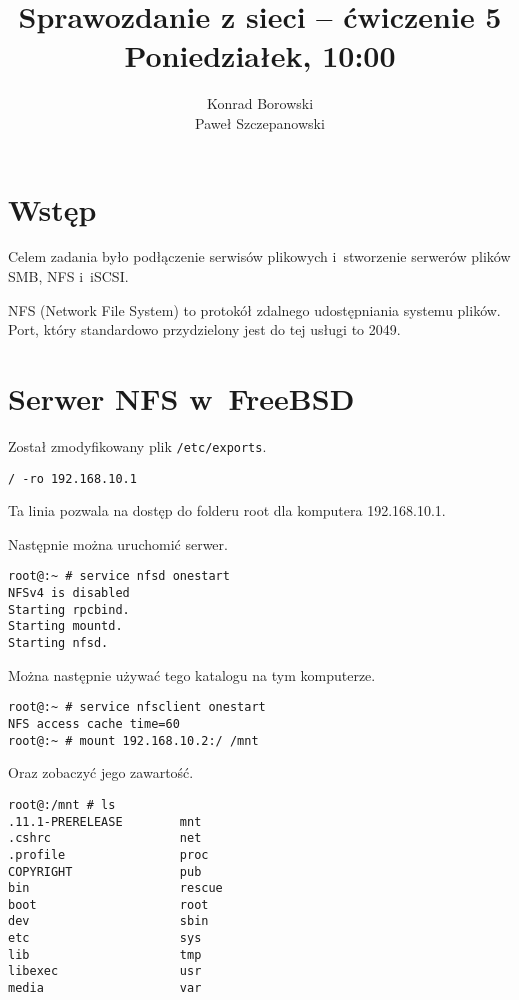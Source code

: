 \documentclass[a4paper,11pt]{article}
\title{Sprawozdanie z sieci -- ćwiczenie 5\\Poniedziałek, 10:00}
\author{Konrad Borowski\\Paweł Szczepanowski}
\begin{document}
\thispagestyle{empty}                   %

\maketitle
\tableofcontent
\section{Wstęp}

Celem zadania było podłączenie serwisów plikowych i~stworzenie serwerów
plików SMB, NFS i~iSCSI.

NFS (Network File System) to protokół zdalnego udostępniania systemu plików. Port, który standardowo przydzielony jest do tej usługi to 2049.

\section{Serwer NFS w~FreeBSD}

Został zmodyfikowany plik \verb|/etc/exports|.

\begin{verbatim}
/ -ro 192.168.10.1
\end{verbatim}

Ta linia pozwala na dostęp do folderu root dla komputera 192.168.10.1.

Następnie można uruchomić serwer.

\begin{verbatim}
root@:~ # service nfsd onestart 
NFSv4 is disabled
Starting rpcbind.
Starting mountd.
Starting nfsd.
\end{verbatim}

Można następnie używać tego katalogu na tym komputerze.

\begin{verbatim}
root@:~ # service nfsclient onestart
NFS access cache time=60            
root@:~ # mount 192.168.10.2:/ /mnt 
\end{verbatim}

Oraz zobaczyć jego zawartość.

\begin{verbatim}
root@:/mnt # ls               
.11.1-PRERELEASE        mnt   
.cshrc                  net   
.profile                proc  
COPYRIGHT               pub   
bin                     rescue
boot                    root  
dev                     sbin  
etc                     sys   
lib                     tmp   
libexec                 usr   
media                   var   
\end{verbatim}
\end{document}

